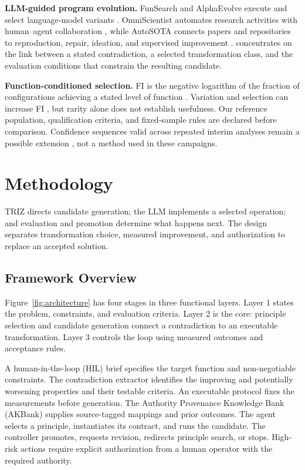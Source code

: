 \documentclass[sigconf]{acmart}
\begin{document}
\textbf{LLM-guided program evolution.} FunSearch and AlphaEvolve execute and
select language-model variants \citep{romeraparedes2024,novikov2025}.
OmniScientist automates research activities with human--agent collaboration
\citep{shao2025omniscientist}, while AutoSOTA connects papers and repositories
to reproduction, repair, ideation, and supervised improvement
\citep{li2026autosota}. \triza{} concentrates on the link between a stated
contradiction, a selected transformation class, and the evaluation
conditions that constrain the resulting candidate.

\textbf{Function-conditioned selection.} FI is the negative logarithm of
the fraction of configurations achieving a stated level of function
\citep{hazen2007}. Variation and selection can increase FI
\citep{wong2023}, but rarity alone does not establish usefulness. Our
reference population, qualification criteria, and fixed-sample rules are
declared before comparison. Confidence sequences valid across repeated
interim analyses remain a possible extension \citep{howard2021}, not a
method used in these campaigns.

\section{Methodology}
\label{sec:method}

TRIZ directs candidate generation; the LLM implements a selected operation;
and evaluation and promotion determine what happens next. The design
separates transformation choice, measured improvement, and authorization
to replace an accepted solution.

\subsection{Framework Overview}
\label{sec:framework}

Figure~\ref{fig:architecture} has four stages in three functional layers.
Layer 1 states the problem, constraints, and evaluation criteria.
Layer 2 is the core: principle selection and candidate generation connect
a contradiction to an executable transformation. Layer 3 controls the
loop using measured outcomes and acceptance rules.

A human-in-the-loop (HIL) brief specifies the target function and
non-negotiable constraints. The contradiction extractor identifies the
improving and potentially worsening properties and their testable
criteria. An executable protocol fixes the measurements before generation.
The Authority Provenance Knowledge Bank (AKBank) supplies source-tagged
mappings and prior outcomes. The agent selects a principle, instantiates
its contract, and runs the candidate. The controller promotes, requests
revision, redirects principle search, or stops. High-risk actions require
explicit authorization from a human operator with the required authority.
\end{document}
